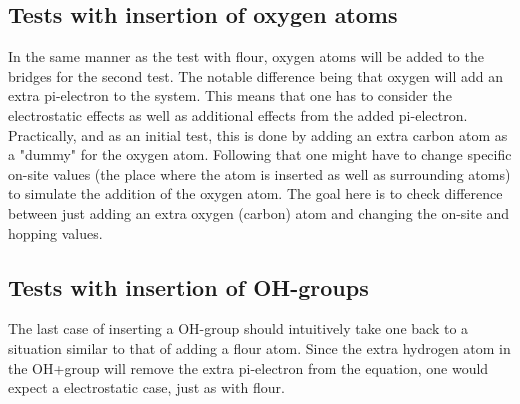 \subsection{Tests with insertion of oxygen atoms}
In the same manner as the test with flour, oxygen atoms will be added to the bridges for the second test. The notable difference being that oxygen will add an extra pi-electron to the system. This means that one has to consider the electrostatic effects as well as additional effects from the added pi-electron. Practically, and as an initial test, this is done by adding an extra carbon atom as a "dummy" for the oxygen atom. Following that one might have to change specific on-site values (the place where the atom is inserted as well as surrounding atoms) to simulate the addition of the oxygen atom. The goal here is to check difference between just adding an extra oxygen (carbon) atom and changing the on-site and hopping values. 
\subsection{Tests with insertion of OH-groups}
The last case of inserting a OH-group should intuitively take one back to a situation similar to that of adding a flour atom. Since the extra hydrogen atom in the OH+group will remove the extra pi-electron from the equation, one would expect a electrostatic case, just as with flour. 